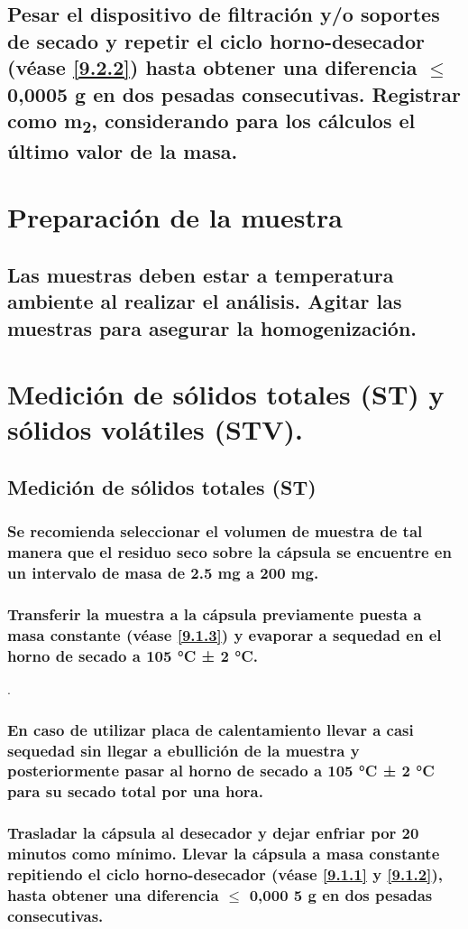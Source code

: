 \documentclass[spanish,12pt,letterpaper,titlepage]{article}
\theoremstyle{definition}
\begin{document}
	\subsection{Pesar el dispositivo de filtración y/o soportes de secado y repetir el ciclo horno-desecador (véase \ref{9.2.2}) hasta obtener una diferencia $\leq$ 0,0005 g en dos pesadas consecutivas. Registrar como m\textsubscript{2}, considerando para los cálculos el último valor de la masa.}\label{9.2.3}
	\section{Preparación de la muestra}\label{9.3}
	\subsection{Las muestras deben estar a temperatura ambiente al realizar el análisis. Agitar las muestras para asegurar la homogenización.}\label{9.3.1}
	\section{Medición de sólidos totales (ST) y sólidos volátiles (STV).}\label{9.4}
	\subsection{Medición de sólidos totales (ST)}\label{9.4.1}
	\subsubsection{Se recomienda seleccionar el volumen de muestra de tal manera que el residuo seco sobre la cápsula se encuentre en un intervalo de masa de 2.5 mg a 200 mg.}\label{9.4.1.1}
	\subsubsection{Transferir la muestra a la cápsula previamente puesta a masa constante (véase \ref{9.1.3}) y evaporar a sequedad en el horno de secado a 105 °C ± 2 °C.}\label{9.4.1.2}.
	\subsubsection{En caso de utilizar placa de calentamiento llevar a casi sequedad sin llegar a ebullición de la muestra y posteriormente pasar al horno de secado a 105 °C ± 2 °C para su secado total por una hora.}\label{9.4.1.3}
	\subsubsection{Trasladar la cápsula al desecador y dejar enfriar por 20 minutos como mínimo. Llevar la cápsula a masa constante repitiendo el ciclo horno-desecador (véase \ref{9.1.1} y \ref{9.1.2}), hasta obtener una diferencia $\leq$ 0,000 5 g en dos pesadas consecutivas.}\label{9.4.1.4}
\end{document}

